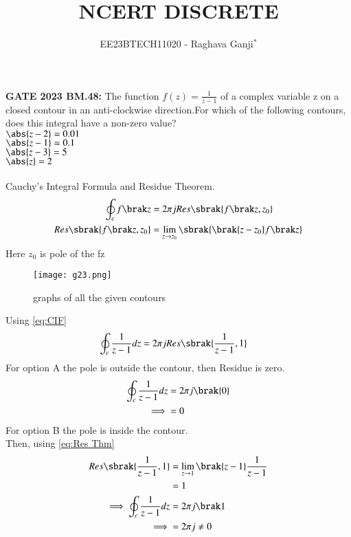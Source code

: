 \documentclass[journal,12pt,twocolumn]{IEEEtran}
\theoremstyle{remark}
\begin{document}

\vspace{3cm}

\title{NCERT DISCRETE}
\author{EE23BTECH11020 - Raghava Ganji$^{*}$%
}
\maketitle
\newpage
\bigskip

\renewcommand{\thefigure}{\theenumi}
\renewcommand{\thetable}{\theenumi}

\textbf{GATE 2023 BM.48:}
The function $f(z)=\frac{1}{z-1}$ of a complex variable z on a closed contour in an anti-clockwise direction.For which of the following contours, does this integral have a non-zero value?\\
$\abs{z-2}=0.01$\\
$\abs{z-1}=0.1$\\
$\abs{z-3}=5$\\
$\abs{z}=2$\\
\solution\\
Cauchy's Integral Formula and Residue Theorem.
\begin{align}
\oint_{c}f\brak z&=2\pi jRes\sbrak{f\brak z,z_0}\label{eq:CIF}\\
Res\sbrak{f\brak z,z_0}&=\lim_{z\to z_0}\sbrak{\brak{z-z_0}f\brak z}\label{eq:Res Thm}
\end{align}
Here $z_0$ is pole of the f\brak z\\
\begin{figure}[h!]
    \centering
    \texttt{[image: g23.png]}
    \caption{graphs of all the given contours}
\end{figure}
Using \eqref{eq:CIF}
\begin{align}
\oint_{c}\frac{1}{z-1}dz &=2\pi jRes\sbrak{\frac{1}{z-1},1}
\end{align}
For option A the pole is outside the contour, then Residue is zero.\\
\begin{align}
\oint_{c}\frac{1}{z-1}dz &=2\pi j\brak{0}\\
\implies&=0
\end{align}
For option B the pole is inside the contour.\\
Then, using \eqref{eq:Res Thm}
\begin{align}
Res\sbrak{\frac{1}{z-1},1} &=\lim_{z\to 1}\brak{z-1}\frac{1}{z-1}\\
&=1\\
\implies \oint_{c}\frac{1}{z-1}dz&=2\pi j\brak 1\\
\implies&=2\pi j\neq 0
\end{align}
\end{document}

